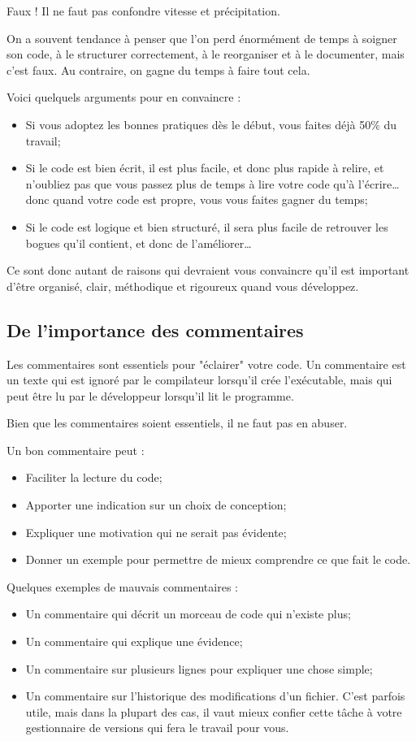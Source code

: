 Faux ! Il ne faut pas confondre vitesse et précipitation.

On a souvent tendance à penser que l'on perd énormément de temps à soigner son code, à le structurer correctement,
à le reorganiser et à le documenter, mais c'est faux. Au contraire, on gagne du temps à faire tout cela.

Voici quelquels arguments pour en convaincre :
\begin{itemize}
  \item Si vous adoptez les bonnes pratiques dès le début, vous faites déjà 50\% du travail;
  \item Si le code est bien écrit, il est plus facile, et donc plus rapide à relire, et n'oubliez pas
  que vous passez plus de temps à lire votre code qu'à l'écrire\ldots donc quand votre code est propre, vous vous faites
  gagner du temps;
  \item Si le code est logique et bien structuré, il sera plus facile de retrouver les bogues qu'il contient, et donc de
  l'améliorer\ldots
\end{itemize}

Ce sont donc autant de raisons qui devraient vous convaincre qu'il est important d'être organisé, clair, méthodique et
rigoureux quand vous développez.

\subsection{De l'importance des commentaires}

Les commentaires sont essentiels pour "éclairer" votre code. Un commentaire est un texte qui est ignoré par le compilateur
lorsqu'il crée l'exécutable, mais qui peut être lu par le développeur lorsqu'il lit le programme.

Bien que les commentaires soient essentiels, il ne faut pas en abuser.

Un bon commentaire peut :
\begin{itemize}
  \item Faciliter la lecture du code;
  \item Apporter une indication sur un choix de conception;
  \item Expliquer une motivation qui ne serait pas évidente;
  \item Donner un exemple pour permettre de mieux comprendre ce que fait le code.
\end{itemize}

Quelques exemples de mauvais commentaires :
\begin{itemize}
  \item Un commentaire qui décrit un morceau de code qui n'existe plus;
  \item Un commentaire qui explique une évidence;
  \item Un commentaire sur plusieurs lignes pour expliquer une chose simple;
  \item Un commentaire sur l'historique des modifications d'un fichier. C'est parfois utile, mais dans la
  plupart des cas, il vaut mieux confier cette tâche à votre gestionnaire de versions qui fera le travail
  pour vous.
\end{itemize}

